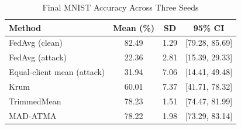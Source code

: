 \begin{table}[t]
\caption{Final MNIST Accuracy Across Three Seeds}
\label{tab:actual_results}
\centering
\scriptsize
\begin{tabular}{lccc}
\toprule
Method & Mean (\%) & SD & 95\% CI \\
\midrule
FedAvg (clean) & 82.49 & 1.29 & [79.28, 85.69] \\
FedAvg (attack) & 22.36 & 2.81 & [15.39, 29.33] \\
Equal-client mean (attack) & 31.94 & 7.06 & [14.41, 49.48] \\
Krum & 60.01 & 7.37 & [41.71, 78.32] \\
TrimmedMean & 78.23 & 1.51 & [74.47, 81.99] \\
MAD-ATMA & 78.22 & 1.98 & [73.29, 83.14] \\
\bottomrule
\end{tabular}
\end{table}
